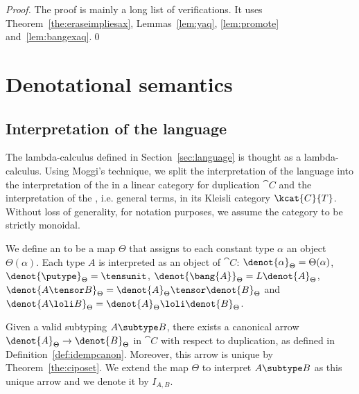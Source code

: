 \documentclass{llncs}
\begin{document}
\begin{proof}
  The proof is mainly a long list of verifications. It uses
  Theorem~\ref{the:eraseimpliesax}, Lemmas~\ref{lem:yaq},
  \ref{lem:promote} and~\ref{lem:bangexaq}.\qed
\end{proof}





\section{Denotational semantics}


\subsection{Interpretation of the language}

The lambda-calculus defined in Section~\ref{sec:language} is thought
as a  lambda-calculus. Using Moggi's technique, 
we split the interpretation of
the language into the interpretation of the  in a
linear category for duplication $\cat{C}$ and the interpretation of
the , i.e. general terms, in its Kleisli
category $\kcat{C}{T}$. Without loss of generality, for notation
purposes, we assume the category to be strictly monoidal.


We define an  to be a
map $\Theta$ that assigns to each constant type $\alpha$ an object
$\Theta(\alpha)$.
Each type $A$ is interpreted as an object of
$\cat{C}$:
$\denot{\alpha}_\Theta = \Theta(\alpha)$,
$\denot{\putype}_\Theta = \tensunit$, 
$\denot{\bang{A}}_\Theta = L{\denot{A}_\Theta}$,
$\denot{A\tensor B}_\Theta =
\denot{A}_\Theta\tensor\denot{B}_\Theta$ and
$\denot{A\loli B}_\Theta
= \denot{A}_\Theta\loli\denot{B}_\Theta$.

Given a valid subtyping $A\subtype B$, there exists a canonical arrow
$\denot{A}_{\Theta}\to \denot{B}_{\Theta}$ in $\cat{C}$ with respect
to duplication, as defined in Definition~\ref{def:idempcanon}.
Moreover, this arrow is unique by Theorem~\ref{the:ciposet}.  We
extend the map $\Theta$ to interpret $A\subtype B$ as this unique
arrow and we denote it by $I_{A,B}$.
\end{document}
